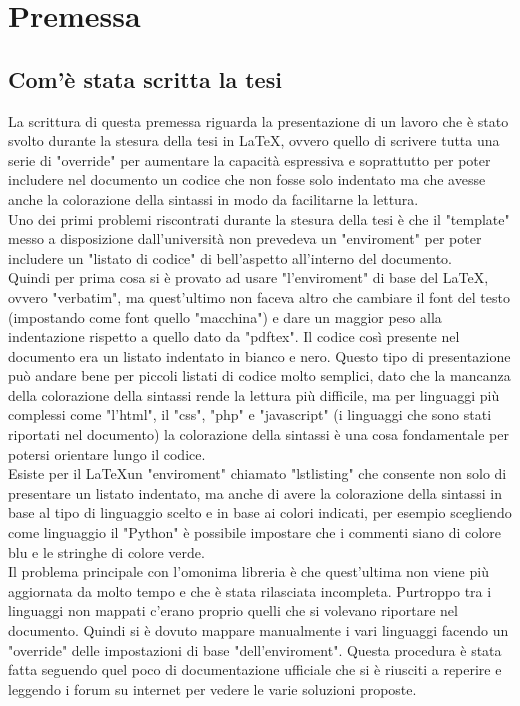 \chapter{Premessa}\label{cap:premessa}

\section{Com'è stata scritta la tesi}\label{sez:Scrittura tesi}

La scrittura di questa premessa riguarda la presentazione di un lavoro che è stato svolto durante la stesura della tesi in \LaTeX, ovvero quello di scrivere tutta una serie di "override" per aumentare la capacità espressiva e soprattutto per poter includere nel documento un codice che non fosse solo indentato ma che avesse anche la colorazione della sintassi in modo da facilitarne la lettura.\\
Uno dei primi problemi riscontrati durante la stesura della tesi è che il "template" messo a disposizione dall'università non prevedeva un "enviroment" per poter includere un "listato di codice" di bell'aspetto all'interno del documento.\\
Quindi per prima cosa si è provato ad usare "l'enviroment" di base del \LaTeX, ovvero "verbatim", ma quest'ultimo non faceva altro  che cambiare il font del testo (impostando come font quello "macchina") e dare un maggior peso alla indentazione rispetto a quello dato da "pdftex". Il codice così presente nel documento era un listato indentato in bianco e nero. Questo tipo di presentazione può andare bene per piccoli listati di codice molto semplici, dato che la mancanza della colorazione della sintassi rende la lettura più difficile, ma per linguaggi più complessi come "l'html", il "css", "php" e "javascript" (i linguaggi che sono stati riportati nel documento) la colorazione della sintassi è una cosa fondamentale per potersi orientare lungo il codice.\\
Esiste per il \LaTeX un "enviroment" chiamato "lstlisting" che consente non solo di presentare un listato indentato, ma anche di avere la colorazione della sintassi in base al tipo di linguaggio scelto e in base ai colori indicati, per esempio scegliendo come linguaggio il "Python" è possibile impostare che i commenti siano di colore blu e le stringhe di colore verde.\\
Il problema principale con l'omonima libreria è che quest'ultima non viene più aggiornata da molto tempo e che è stata rilasciata incompleta. Purtroppo tra i linguaggi non mappati c'erano proprio quelli che si volevano riportare nel documento. Quindi si è dovuto mappare manualmente i vari linguaggi facendo un "override" delle impostazioni di base "dell'enviroment". Questa procedura è stata fatta seguendo quel poco di documentazione ufficiale che si è riusciti a reperire e leggendo i forum su internet per vedere le varie soluzioni proposte.\\
